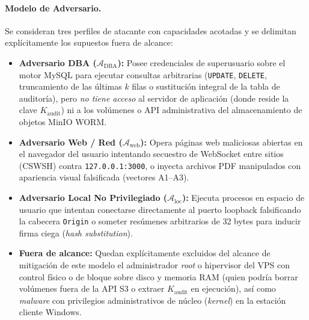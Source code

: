 \documentclass[runningheads,twocolumn]{llncs}
\begin{document}
\paragraph{Modelo de Adversario.} Se consideran tres perfiles de atacante con capacidades acotadas y se delimitan explícitamente los supuestos fuera de alcance:
\begin{itemize}
    \item \textbf{Adversario DBA ($\mathcal{A}_{\text{DBA}}$):} Posee credenciales de superusuario sobre el motor MySQL para ejecutar consultas arbitrarias (\texttt{UPDATE}, \texttt{DELETE}, truncamiento de las últimas $k$ filas o sustitución integral de la tabla de auditoría), pero \emph{no tiene acceso} al servidor de aplicación (donde reside la clave $K_{\text{audit}}$) ni a los volúmenes o API administrativa del almacenamiento de objetos MinIO WORM.
    \item \textbf{Adversario Web / Red ($\mathcal{A}_{\text{web}}$):} Opera páginas web maliciosas abiertas en el navegador del usuario intentando secuestro de WebSocket entre sitios (CSWSH) contra \texttt{127.0.0.1:3000}, o inyecta archivos PDF manipulados con apariencia visual falsificada (vectores A1--A3).
    \item \textbf{Adversario Local No Privilegiado ($\mathcal{A}_{\text{loc}}$):} Ejecuta procesos en espacio de usuario que intentan conectarse directamente al puerto loopback falsificando la cabecera \texttt{Origin} o someter resúmenes arbitrarios de 32 bytes para inducir firma ciega (\textit{hash substitution}).
    \item \textbf{Fuera de alcance:} Quedan explícitamente excluidos del alcance de mitigación de este modelo el administrador \textit{root} o hipervisor del VPS con control físico o de bloque sobre disco y memoria RAM (quien podría borrar volúmenes fuera de la API S3 o extraer $K_{\text{audit}}$ en ejecución), así como \textit{malware} con privilegios administrativos de núcleo (\textit{kernel}) en la estación cliente Windows.
\end{itemize}
\end{document}
